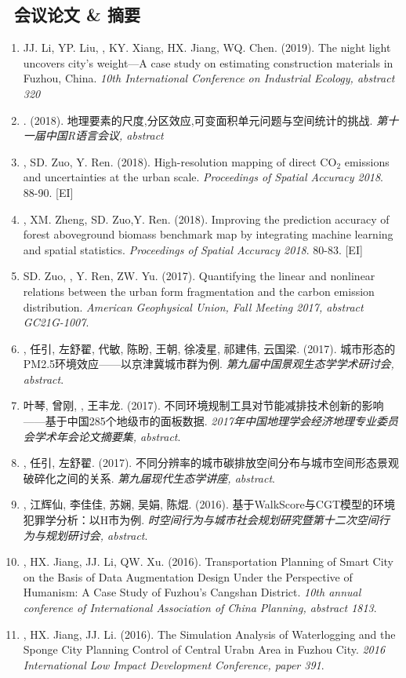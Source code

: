 \subsection*{\texorpdfstring{\faBook\ 会议论文 \& 摘要}{会议论文 \& 摘要}}
\begin{enumerate}
\item
    JJ. Li, YP. Liu, \Shaoqing, KY. Xiang, HX. Jiang, WQ. Chen. (2019).
    The night light uncovers city's weight—A case study on estimating construction materials in Fuzhou, China.
    \textit{10th International Conference on Industrial Ecology, abstract 320}
\item
    {}. (2018).
    地理要素的尺度,分区效应,可变面积单元问题与空间统计的挑战.
    \textit{第十一届中国R语言会议, abstract}
\item
    \Shaoqing, SD. Zuo, Y. Ren. (2018).
    High-resolution mapping of direct CO$_2$ emissions and uncertainties at the urban scale.
    \textit{Proceedings of Spatial Accuracy 2018}. 88-90. [EI]
\item
    \Shaoqing\CF, XM. Zheng, SD. Zuo,Y. Ren. (2018).
    Improving the prediction accuracy of forest aboveground biomass benchmark map by integrating machine learning and spatial statistics.
    \textit{Proceedings of Spatial Accuracy 2018}. 80-83. [EI]
\item
    SD. Zuo, \Shaoqing, Y. Ren, ZW. Yu. (2017).
    Quantifying the linear and nonlinear relations between the urban form fragmentation and the carbon emission distribution.
    \textit{American Geophysical Union, Fall Meeting 2017, abstract GC21G-1007}.
\item
    {}, 任引, 左舒翟, 代敏, 陈盼, 王朝, 徐凌星, 祁建伟, 云国梁. (2017).
    城市形态的PM2.5环境效应——以京津冀城市群为例.
    \textit{第九届中国景观生态学学术研讨会, abstract}.
\item
    叶琴, 曾刚, {}, 王丰龙. (2017).
    不同环境规制工具对节能减排技术创新的影响——基于中国285个地级市的面板数据.
    \textit{2017年中国地理学会经济地理专业委员会学术年会论文摘要集, abstract}.
\item
    {}, 任引, 左舒翟. (2017).
    不同分辨率的城市碳排放空间分布与城市空间形态景观破碎化之间的关系.
    \textit{第九届现代生态学讲座, abstract}.
\item
    {}, 江辉仙, 李佳佳, 苏娴, 吴娟, 陈焜. (2016).
    基于WalkScore与CGT模型的环境犯罪学分析：以H市为例.
    \textit{时空间行为与城市社会规划研究暨第十二次空间行为与规划研讨会, abstract}.
\item
    \Shaoqing, HX. Jiang, JJ. Li, QW. Xu. (2016).
    Transportation Planning of Smart City on the Basis of Data Augmentation Design Under the Perspective of Humanism: A Case Study of Fuzhou's Cangshan District.
    \textit{10th annual conference of International Association of China Planning, abstract 1813}.
\item
   \Shaoqing, HX. Jiang, JJ. Li. (2016).
    The Simulation Analysis of Waterlogging and the Sponge City Planning Control of Central Urabn Area in Fuzhou City.
    \textit{2016 International Low Impact Development Conference, paper 391}.
\end{enumerate}


